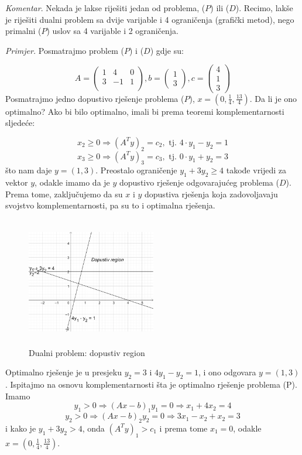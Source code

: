 \documentclass[a4paper, utf8, 11pt, colorlinks]{article}
\begin{document}
\emph{Komentar}.  Nekada je lakse riješiti jedan od problema, ($P$)  ili  ($D$).  Recimo, lakše je riješiti dualni problem sa dvije varijable i 4 ograničenja (grafički metod), nego primalni  ($P$)  uslov sa 4 varijable i 2 ograničenja. 

\emph{Primjer.} Posmatrajmo problem  ($P$)  i  ($D$)  gdje su:
 
$$      A = \left(\begin{array}{ccc}
          1 &  4 & 0 \\
          3 & -1 & 1 \\
      \end{array} \right ), b = \left (\begin{array}{c}
           1 \\
           3
      \end{array}\right ), c =\left ( \begin{array}{c}
           4  \\
           1  \\
           3
      \end{array} \right )
 $$
Posmatrajmo jedno dopustivo rješenje problema  ($P$), $x = (0, \frac{1}{4}, \frac{13}{4})$. Da li je ono optimalno? Ako bi bilo optimalno, imali bi prema teoremi komplementarnosti sljedeće:

$$x_2 \geq 0 \Rightarrow  (A^T y)_2  = c_2, \mbox{ tj. } 4 \cdot y_1 - y_2 = 1$$
$$x_3 \geq 0 \Rightarrow  (A^T y)_3  = c_3, \mbox{ tj. } 0 \cdot y_1 + y_2 = 3$$
što nam daje  $y = (1, 3)$. Preostalo ograničenje $y_1 + 3 y_2 \geq 4$ takođe vrijedi za vektor $y$, odakle imamo da je $y$ dopustivo rješenje odgovarajućeg problema  ($D$).  Prema tome, zaključujemo da su $x$ i $y$ dopustiva rješenja koja zadovoljavaju svojstvo komplementarnosti, pa su to i optimalna rješenja. 

\begin{figure}[!ht]
    \centering
     \includegraphics[width=160pt, height=160pt]{fig5.eps}
    \caption{Dualni problem: dopustiv region}
    \label{fig:fig5}
\end{figure}
Optimalno rješenje je u presjeku $y_2 = 3$ i $4y_1 - y_2 = 1$, i ono odgovara $y = (1, 3)$. Ispitajmo na osnovu komplementarnosti šta je optimalno rješenje problema (P). Imamo 
$$y_1 > 0 \Rightarrow (Ax - b)_1 y_1 = 0 \Rightarrow x_1 + 4 x_2 = 4 $$
$$y_2 > 0 \Rightarrow (Ax - b)_2 y_2 = 0 \Rightarrow 3x_1 - x_2 + x_2 = 3 $$
i kako je $y_1 + 3 y_2 > 4$, onda $(A^Ty)_1 > c_1$ i prema tome $x_1 =0$, 
odakle $x =(0, \frac{1}{4}, \frac{13}{4})$. 
\end{document}
